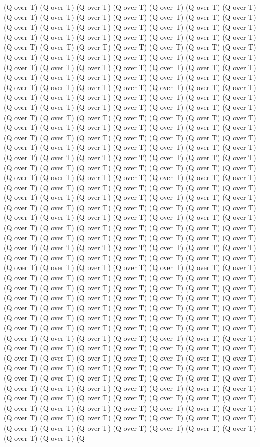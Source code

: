 (Q over T) (Q over T) (Q over T) (Q over T) (Q over T) (Q over T) (Q over T) (Q over T) (Q over T) (Q over T) (Q over T) (Q over T) (Q over T) (Q over T) (Q over T) (Q over T) (Q over T) (Q over T) (Q over T) (Q over T) (Q over T) (Q over T) (Q over T) (Q over T) (Q over T) (Q over T) (Q over T) (Q over T) (Q over T) (Q over T) (Q over T) (Q over T) (Q over T) (Q over T) (Q over T) (Q over T) (Q over T) (Q over T) (Q over T) (Q over T) (Q over T) (Q over T) (Q over T) (Q over T) (Q over T) (Q over T) (Q over T) (Q over T) (Q over T) (Q over T) (Q over T) (Q over T) (Q over T) (Q over T) (Q over T) (Q over T) (Q over T) (Q over T) (Q over T) (Q over T) (Q over T) (Q over T) (Q over T) (Q over T) (Q over T) (Q over T) (Q over T) (Q over T) (Q over T) (Q over T) (Q over T) (Q over T) (Q over T) (Q over T) (Q over T) (Q over T) (Q over T) (Q over T) (Q over T) (Q over T) (Q over T) (Q over T) (Q over T) (Q over T) (Q over T) (Q over T) (Q over T) (Q over T) (Q over T) (Q over T) (Q over T) (Q over T) (Q over T) (Q over T) (Q over T) (Q over T) (Q over T) (Q over T) (Q over T) (Q over T) (Q over T) (Q over T) (Q over T) (Q over T) (Q over T) (Q over T) (Q over T) (Q over T) (Q over T) (Q over T) (Q over T) (Q over T) (Q over T) (Q over T) (Q over T) (Q over T) (Q over T) (Q over T) (Q over T) (Q over T) (Q over T) (Q over T) (Q over T) (Q over T) (Q over T) (Q over T) (Q over T) (Q over T) (Q over T) (Q over T) (Q over T) (Q over T) (Q over T) (Q over T) (Q over T) (Q over T) (Q over T) (Q over T) (Q over T) (Q over T) (Q over T) (Q over T) (Q over T) (Q over T) (Q over T) (Q over T) (Q over T) (Q over T) (Q over T) (Q over T) (Q over T) (Q over T) (Q over T) (Q over T) (Q over T) (Q over T) (Q over T) (Q over T) (Q over T) (Q over T) (Q over T) (Q over T) (Q over T) (Q over T) (Q over T) (Q over T) (Q over T) (Q over T) (Q over T) (Q over T) (Q over T) (Q over T) (Q over T) (Q over T) (Q over T) (Q over T) (Q over T) (Q over T) (Q over T) (Q over T) (Q over T) (Q over T) (Q over T) (Q over T) (Q over T) (Q over T) (Q over T) (Q over T) (Q over T) (Q over T) (Q over T) (Q over T) (Q over T) (Q over T) (Q over T) (Q over T) (Q over T) (Q over T) (Q over T) (Q over T) (Q over T) (Q over T) (Q over T) (Q over T) (Q over T) (Q over T) (Q over T) (Q over T) (Q over T) (Q over T) (Q over T) (Q over T) (Q over T) (Q over T) (Q over T) (Q over T) (Q over T) (Q over T) (Q over T) (Q over T) (Q over T) (Q over T) (Q over T) (Q over T) (Q over T) (Q over T) (Q over T) (Q over T) (Q over T) (Q over T) (Q over T) (Q over T) (Q over T) (Q over T) (Q over T) (Q over T) (Q over T) (Q over T) (Q over T) (Q over T) (Q over T) (Q over T) (Q over T) (Q over T) (Q over T) (Q over T) (Q over T) (Q over T) (Q over T) (Q over T) (Q over T) (Q over T) (Q over T) (Q over T) (Q over T) (Q over T) (Q over T) (Q over T) (Q over T) (Q over T) (Q over T) (Q over T) (Q over T) (Q over T) (Q over T) (Q over T) (Q over T) (Q over T) (Q over T) (Q over T) (Q over T) (Q over T) (Q over T) (Q over T) (Q over T) (Q over T) (Q over T) (Q over T) (Q over T) (Q over T) (Q over T) (Q over T) (Q over T) (Q over T) (Q over T) (Q over T) (Q over T) (Q over T) (Q over T) (Q over T) (Q over T) (Q over T) (Q over T) (Q over T) (Q over T) (Q over T) (Q over T) (Q over T) (Q over T) (Q over T) (Q over T) (Q over T) (Q over T) (Q 